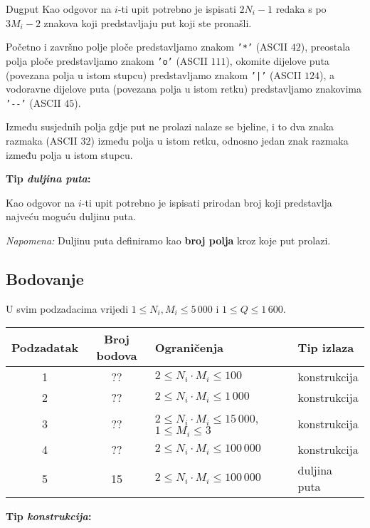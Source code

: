 \begin{statement}[
  problempoints=100,
  timelimit=1 sekunda,
  memorylimit=512 MiB,
]{Dugput}
Kao odgovor na $i$-ti upit potrebno je ispisati $2N_i-1$ redaka s po $3M_i-2$
znakova koji predstavljaju put koji ste pronašli.

Početno i završno polje ploče predstavljamo znakom \texttt{'*'} (ASCII $42$),
preostala polja ploče predstavljamo znakom \texttt{'o'} (ASCII $111$),
okomite dijelove puta (povezana polja u istom stupcu) predstavljamo znakom
\texttt{'|'} (ASCII $124$), a vodoravne dijelove puta (povezana polja u istom
retku) predstavljamo znakovima \texttt{'-{}-'} (ASCII $45$).

Između susjednih polja gdje put ne prolazi nalaze se bjeline, i to dva znaka
razmaka (ASCII $32$) između polja u istom retku, odnosno jedan znak razmaka
između polja u istom stupcu.

\textbf{Tip \textit{duljina puta}:}

Kao odgovor na $i$-ti upit potrebno je ispisati prirodan broj koji predstavlja
najveću moguću duljinu puta.

\textit{Napomena:} Duljinu puta definiramo kao \textbf{broj polja} kroz koje put prolazi.

\subsection*{Bodovanje}
U svim podzadacima vrijedi $1 \leq N_i, M_i \leq 5\,000$ i $1 \leq Q \leq 1\,600$.

{\renewcommand{\arraystretch}{1.4}
  \setlength{\tabcolsep}{6pt}
  \begin{tabular}{ccll}
  Podzadatak & Broj bodova & Ograničenja & Tip izlaza \\ \midrule
  1 & ?? & $2 \leq N_i \cdot M_i \leq 100$ & konstrukcija \\
  2 & ?? & $2 \leq N_i \cdot M_i \leq 1\,000$ & konstrukcija \\
  3 & ?? & $2 \leq N_i \cdot M_i \leq 15\,000$, $1 \leq M_i \leq 3$ & konstrukcija \\
  4 & ?? & $2 \leq N_i \cdot M_i \leq 100\,000$ & konstrukcija \\
  5 & 15 & $2 \leq N_i \cdot M_i \leq 100\,000$ & duljina puta \\
\end{tabular}}

\textbf{Tip \textit{konstrukcija}:}


\end{statement}
